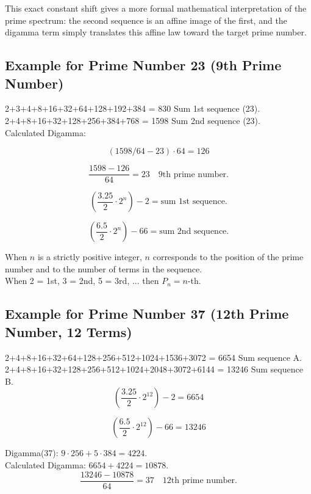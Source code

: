 \documentclass[a4paper,11pt]{article}
\begin{document}
This exact constant shift gives a more formal mathematical interpretation of the
prime spectrum: the second sequence is an affine image of the first, and the
digamma term simply translates this affine law toward the target prime number.

\subsection*{Example for Prime Number 23 (9th Prime Number)}

2+3+4+8+16+32+64+128+192+384 = 830 Sum 1st sequence (23).\\
2+4+8+16+32+128+256+384+768 = 1598 Sum 2nd sequence (23).\\

Calculated Digamma:

\[
(1598/64 - 23) \cdot 64 = 126
\]

\[
\frac{1598 - 126}{64} = 23 \quad \text{9th prime number.}
\]

\[
\left(\frac{3.25}{2} \cdot 2^{n}\right) - 2 = \text{sum 1st sequence.}
\]

\[
\left(\frac{6.5}{2} \cdot 2^{n}\right) - 66 = \text{sum 2nd sequence.}
\]

When \(n\) is a strictly positive integer, \(n\) corresponds to the position of the prime number and to the number of terms in the sequence.\\
When 2 = 1st, 3 = 2nd, 5 = 3rd, ... then \(P_{n} = n\)-th.

\bigskip

\subsection*{Example for Prime Number 37 (12th Prime Number, 12 Terms)}

2+4+8+16+32+64+128+256+512+1024+1536+3072 = 6654 Sum sequence A.\\
2+4+8+16+32+128+256+512+1024+2048+3072+6144 = 13246 Sum sequence B.\\

\[
\left(\frac{3.25}{2} \cdot 2^{12}\right) - 2 = 6654
\]

\[
\left(\frac{6.5}{2} \cdot 2^{12}\right) - 66 = 13246
\]

Digamma(37): \(9 \cdot 256 + 5 \cdot 384 = 4224\).\\
Calculated Digamma: \(6654 + 4224 = 10878\).\\

\[
\frac{13246 - 10878}{64} = 37 \quad \text{12th prime number.}
\]
\end{document}
